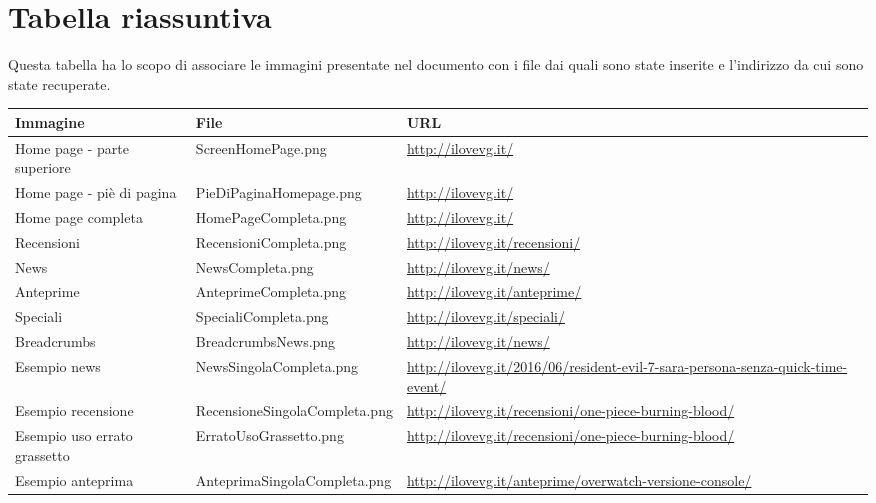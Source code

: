 \documentclass[../ProgettoTecWeb2.tex]{subfiles}
\begin{document}
\section{Tabella riassuntiva}
	Questa tabella ha lo scopo di associare le immagini presentate nel documento con i file dai quali sono state inserite e l'indirizzo da cui sono state recuperate.
	\begin{longtabu} to \textwidth {X[l m 0.5] X[l m 1.3] X[l m]}
		\toprule
		\textbf{Immagine} & \textbf{File}  & \textbf{URL}\\
		\midrule
		\endhead

	Home page - parte superiore & ScreenHomePage.png & \href{http://ilovevg.it/}{http://ilovevg.it/}\\ 
	\midrule
	Home page - piè di pagina & PieDiPaginaHomepage.png & \href{http://ilovevg.it/}{http://ilovevg.it/}\\ 
	\midrule
	Home page completa & HomePageCompleta.png & \href{http://ilovevg.it/}{http://ilovevg.it/}\\
	\midrule
	Recensioni & RecensioniCompleta.png & \href{http://ilovevg.it/recensioni/}{http://ilovevg.it/recensioni/}\\
	\midrule
	News & NewsCompleta.png & \href{http://ilovevg.it/news/}{http://ilovevg.it/news/}\\
	\midrule
	Anteprime & AnteprimeCompleta.png & \href{http://ilovevg.it/anteprime/}{http://ilovevg.it/anteprime/}\\	
	\midrule
	Speciali & SpecialiCompleta.png & \href{http://ilovevg.it/speciali/}{http://ilovevg.it/speciali/}\\
	\midrule
	Breadcrumbs & BreadcrumbsNews.png & \href{http://ilovevg.it/news/}{http://ilovevg.it/news/}\\
	\midrule
	Esempio news & NewsSingolaCompleta.png & \href{http://ilovevg.it/2016/06/resident-evil-7-sara-persona-senza-quick-time-event/}{http://ilovevg.it/2016/06/resident-evil-7-sara-persona-senza-quick-time-event/}\\
	\midrule
	Esempio recensione & RecensioneSingolaCompleta.png & \href{http://ilovevg.it/recensioni/one-piece-burning-blood/}{http://ilovevg.it/recensioni/one-piece-burning-blood/}\\
	\midrule
	Esempio uso errato grassetto & ErratoUsoGrassetto.png & \href{http://ilovevg.it/recensioni/one-piece-burning-blood/}{http://ilovevg.it/recensioni/one-piece-burning-blood/}\\
	\midrule
	Esempio anteprima & AnteprimaSingolaCompleta.png & \href{http://ilovevg.it/anteprime/overwatch-versione-console/}{http://ilovevg.it/anteprime/overwatch-versione-console/}\\ 

\end{longtabu}
\end{document}
